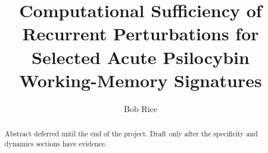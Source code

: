 \documentclass[11pt,reprint,aps,prl,floatfix,secnumarabic,nofootinbib]{revtex4-2}
\begin{document}
\title{Computational Sufficiency of Recurrent Perturbations for
Selected Acute Psilocybin Working-Memory Signatures}

\author{Bob Rice}

\begin{abstract}
Abstract deferred until the end of the project. Draft only after the
specificity and dynamics sections have evidence.
\end{abstract}

\maketitle

\tableofcontents














\end{document}
